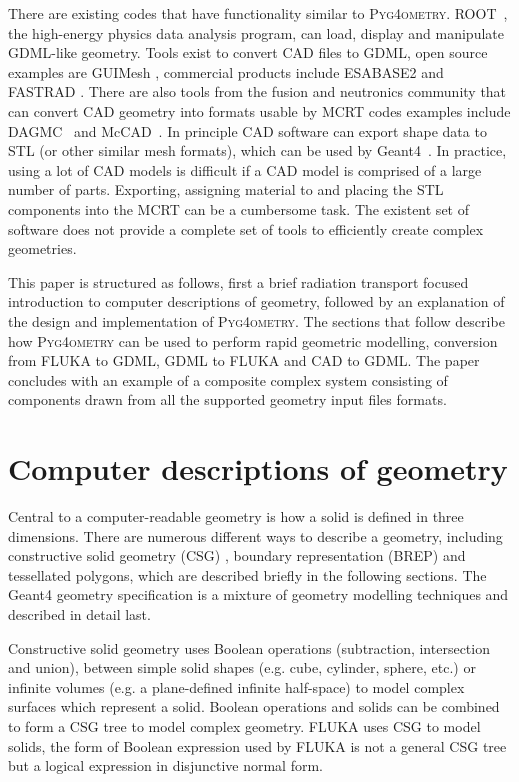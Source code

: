 \documentclass[final,5p,times,twocolumn]{elsarticle}
\newcommand{\PYGEOMETRY}{\textsc{Pyg4ometry}}
\begin{document}
There are existing codes that have functionality similar to \PYGEOMETRY{}. ROOT~\cite{Brun:1997pa}, the high-energy physics data analysis program, 
can load, display and manipulate GDML-like geometry. Tools exist to convert CAD files to GDML, open source examples are GUIMesh \cite{GUIMesh_Pinto}, commercial 
products include ESABASE2 \cite{ESABASE2} and FASTRAD \cite{FASTRAD}. There are also tools from the fusion and neutronics community that can convert CAD 
geometry into formats usable by MCRT codes examples include DAGMC~\cite{DAGMC} and McCAD~\cite{McCad}. In principle CAD software can export shape data to STL 
(or other similar mesh formats), which can be used by Geant4~\cite{poole2012acad}. In practice, using a lot of CAD models is difficult if a CAD model is comprised of a 
large number of parts. Exporting, assigning material to and placing the STL components into the MCRT can be a cumbersome task. The existent set of software does not 
provide a complete set of tools to efficiently create complex geometries.

This paper is structured as follows, first a brief radiation transport focused introduction to computer descriptions of geometry, followed by an explanation of the design 
and implementation of \PYGEOMETRY{}. The sections that follow describe how \PYGEOMETRY{} can be used to perform rapid geometric modelling, conversion from 
FLUKA to GDML, GDML to FLUKA and CAD to GDML. The paper concludes with an example of a composite complex system consisting of components drawn from 
all the supported  geometry input files formats.

\section{Computer descriptions of geometry} \label{sec:geometric}
Central to a computer-readable geometry is how a solid is defined in three dimensions. There are numerous different ways to describe a
geometry, including constructive solid geometry (CSG) , boundary representation (BREP) and tessellated polygons, which are described 
briefly in the following sections.  The Geant4 geometry specification is a mixture of geometry modelling techniques and described in detail last.

Constructive solid geometry uses Boolean operations (subtraction, intersection and union), between simple solid shapes (e.g. cube, cylinder, sphere, etc.) or infinite
volumes (e.g. a plane-defined infinite half-space) to model complex surfaces which represent a solid. Boolean operations and solids can be combined to form a 
CSG tree to model complex geometry. FLUKA uses CSG to model solids, the form of Boolean expression used by FLUKA is not a general CSG tree but a 
logical expression in disjunctive normal form.
\end{document}
